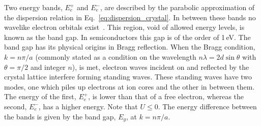 Two energy bands, $E_e^+$ and $E_e^-$, are described by the parabolic approximation of the dispersion relation in Eq.~\ref{eq:dispersion_crystal}. In between these bands no wavelike electron orbitals exist~\cite{kittel}. This region, void of allowed energy levels, is known as the band gap. In semiconductors this gap is of the order of 1\,eV. The band gap has its physical origins in Bragg reflection. When the Bragg condition, $k=n\pi/a$ (commonly stated as a condition on the wavelength $n\lambda = 2d\sin\theta$ with $\theta = \pi/2$ and integer $n$), is met, electron waves incident on and reflected by the crystal lattice interfere forming standing waves. These standing waves have two modes, one which piles up electrons at ion cores and the other in between them. The energy of the first, $E_e^+$, is lower than that of a free electron, whereas the second, $E_e^-$, has a higher energy. Note that $U \le 0$. The energy difference between the bands is given by the band gap, $E_g$, at $k=n\pi/a$.

